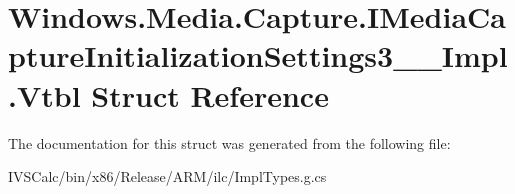 \hypertarget{struct_windows_1_1_media_1_1_capture_1_1_i_media_capture_initialization_settings3_____impl_1_1_vtbl}{}\section{Windows.\+Media.\+Capture.\+I\+Media\+Capture\+Initialization\+Settings3\+\_\+\+\_\+\+Impl.\+Vtbl Struct Reference}
\label{struct_windows_1_1_media_1_1_capture_1_1_i_media_capture_initialization_settings3_____impl_1_1_vtbl}


The documentation for this struct was generated from the following file\+:\begin{DoxyCompactItemize}
\item 
I\+V\+S\+Calc/bin/x86/\+Release/\+A\+R\+M/ilc/Impl\+Types.\+g.\+cs\end{DoxyCompactItemize}
